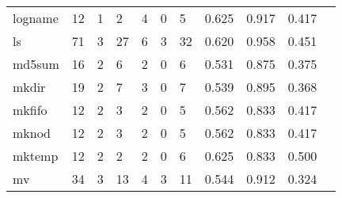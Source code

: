 \begin{longtable}{lp{1.10cm}p{1.10cm}p{1.10cm}p{1.10cm}p{1.10cm}p{1.10cm}p{1.10cm}p{1.10cm}p{1.10cm}p{1.10cm}}
logname   &                     12 &                                  1 &                                 2 &                                4 &                                 0 &                               5 &                          0.625 &                                 0.917 &                               0.417 \\
ls        &                     71 &                                  3 &                                27 &                                6 &                                 3 &                              32 &                          0.620 &                                 0.958 &                               0.451 \\
md5sum    &                     16 &                                  2 &                                 6 &                                2 &                                 0 &                               6 &                          0.531 &                                 0.875 &                               0.375 \\
mkdir     &                     19 &                                  2 &                                 7 &                                3 &                                 0 &                               7 &                          0.539 &                                 0.895 &                               0.368 \\
mkfifo    &                     12 &                                  2 &                                 3 &                                2 &                                 0 &                               5 &                          0.562 &                                 0.833 &                               0.417 \\
mknod     &                     12 &                                  2 &                                 3 &                                2 &                                 0 &                               5 &                          0.562 &                                 0.833 &                               0.417 \\
mktemp    &                     12 &                                  2 &                                 2 &                                2 &                                 0 &                               6 &                          0.625 &                                 0.833 &                               0.500 \\
mv        &                     34 &                                  3 &                                13 &                                4 &                                 3 &                              11 &                          0.544 &                                 0.912 &                               0.324 \\

\end{longtable}

